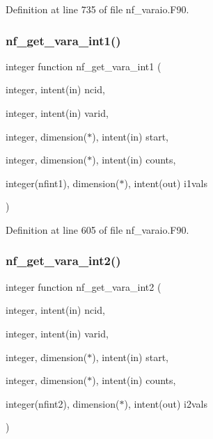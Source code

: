 Definition at line 735 of file nf\+\_\+varaio.\+F90.

\mbox{\label{nf__varaio_8F90_a3d9229b7979dae378c63dff2ac198cf6}} 
\subsubsection{\texorpdfstring{nf\+\_\+get\+\_\+vara\+\_\+int1()}{nf\_get\_vara\_int1()}}
{\footnotesize\ttfamily integer function nf\+\_\+get\+\_\+vara\+\_\+int1 (\begin{DoxyParamCaption}\item[{integer, intent(in)}]{ncid,  }\item[{integer, intent(in)}]{varid,  }\item[{integer, dimension($\ast$), intent(in)}]{start,  }\item[{integer, dimension($\ast$), intent(in)}]{counts,  }\item[{integer(nfint1), dimension($\ast$), intent(out)}]{i1vals }\end{DoxyParamCaption})}



Definition at line 605 of file nf\+\_\+varaio.\+F90.

\mbox{\label{nf__varaio_8F90_afcb9640178d83ea181103af7597be73f}} 
\subsubsection{\texorpdfstring{nf\+\_\+get\+\_\+vara\+\_\+int2()}{nf\_get\_vara\_int2()}}
{\footnotesize\ttfamily integer function nf\+\_\+get\+\_\+vara\+\_\+int2 (\begin{DoxyParamCaption}\item[{integer, intent(in)}]{ncid,  }\item[{integer, intent(in)}]{varid,  }\item[{integer, dimension($\ast$), intent(in)}]{start,  }\item[{integer, dimension($\ast$), intent(in)}]{counts,  }\item[{integer(nfint2), dimension($\ast$), intent(out)}]{i2vals }\end{DoxyParamCaption})}



